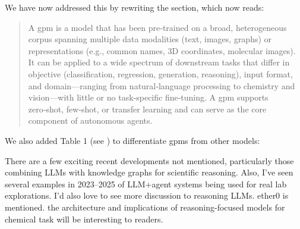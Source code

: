 \begin{reply}
We have now addressed this by rewriting the section, which now reads:
\begin{quote}
A \gls{gpm} is a model that has been pre‑trained on a broad, heterogeneous corpus spanning multiple data modalities (text, images, graphs) or representations (e.g., common names, 3D coordinates, molecular images).
It can be applied to a wide spectrum of downstream tasks that differ in objective (classification, regression, generation, reasoning), input format, and domain---ranging from natural‑language processing to chemistry and vision---with little or no task‑specific fine‑tuning.
A \gls{gpm} supports zero‑shot, few‑shot, or transfer learning and can serve as the core component of autonomous agents.
\end{quote}

 We also added Table 1 (see ) to differentiate \glspl{gpm} from other models:
\end{reply}

\begin{point}
There are a few exciting recent developments not mentioned, particularly those combining LLMs with knowledge graphs for scientific reasoning. Also, I've seen several examples in 2023–2025 of LLM+agent systems being used for real lab explorations. I'd also love to see more discussion to reasoning LLMs. ether0 is mentioned. the architecture and implications of reasoning-focused models for chemical task will be interesting to readers.
\end{point}

